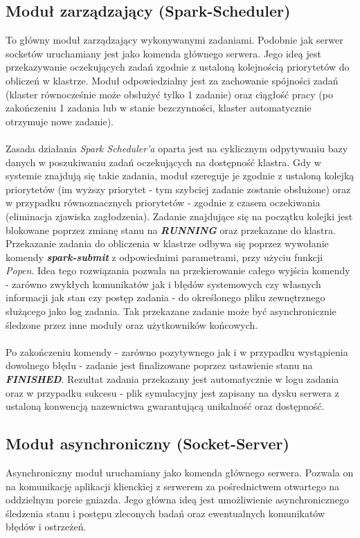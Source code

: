 \documentclass[a4paper,onecolumn,oneside,12pt]{memoir}
\begin{document}
{\subsection{Moduł zarządzający (Spark-Scheduler)}
\quad \quad To główny moduł zarządzający wykonywanymi zadaniami. Podobnie jak serwer socketów
uruchamiany jest jako komenda głównego serwera. Jego ideą jest
przekazywanie oczekujących zadań zgodnie z ustaloną kolejnością priorytetów
do obliczeń w klastrze. Moduł odpowiedzialny jest za zachowanie spójności zadań
(klaster równocześnie może obsłużyć tylko 1 zadanie) oraz ciągłość pracy
(po zakończeniu 1 zadania lub w stanie bezczynności, klaster automatycznie otrzymuje
nowe zadanie).\\
\\
Zasada działania \textit{Spark Scheduler'a} oparta jest na cyklicznym odpytywaniu bazy danych
w poszukiwaniu zadań oczekujących na dostępność klastra. Gdy w systemie znajdują się
takie zadania, moduł szereguje je zgodnie z ustaloną kolejką priorytetów (im wyższy
priorytet - tym szybciej zadanie zostanie obsłużone) oraz w przypadku równoznacznych
priorytetów - zgodnie z czasem oczekiwania (eliminacja zjawiska zagłodzenia).
Zadanie znajdujące się na początku kolejki jest blokowane poprzez zmianę stanu
na \textbf{\textit{RUNNING}} oraz przekazane do klastra.\\
Przekazanie zadania do obliczenia w klastrze odbywa się poprzez wywołanie komendy
\textbf{\textit{spark-submit}} z odpowiednimi parametrami, przy użyciu funkcji \textit{Popen}. Idea tego
rozwiązania pozwala na przekierowanie całego wyjścia komendy - zarówno zwykłych
komunikatów jak i błędów systemowych czy własnych informacji jak stan czy postęp
zadania - do określonego pliku zewnętrznego służącego jako log zadania. Tak przekazane
zadanie może być asynchronicznie śledzone przez inne moduły oraz użytkowników końcowych.\\
\\
Po zakończeniu komendy - zarówno pozytywnego jak i w przypadku wystąpienia dowolnego
błędu - zadanie jest finalizowane poprzez ustawienie stanu na \textbf{\textit{FINISHED}}. Rezultat
zadania przekazany jest automatycznie w logu zadania oraz w przypadku sukcesu -
plik symulacyjny jest zapisany na dysku serwera z ustaloną konwencją nazewnictwa
gwarantującą unikalność oraz dostępność.\\

\subsection{Moduł asynchroniczny (Socket-Server)}
\quad \quad Asynchroniczny moduł uruchamiany jako komenda głównego serwera. Pozwala on na
komunikację aplikacji klienckiej z serwerem za pośrednictwem otwartego na oddzielnym
porcie gniazda. Jego główna ideą jest umożliwienie asynchronicznego śledzenia
stanu i postępu zleconych badań oraz ewentualnych komunikatów błędów i ostrzeżeń.\\

}
\end{document}
